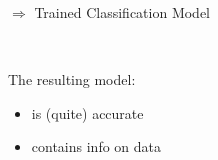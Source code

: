 \documentclass[17pt,aspectratio=169]{beamer}
\begin{document}
\begin{frame}{$\boldsymbol{\Rightarrow}$ Trained Classification Model}
  \begin{minipage}{0.55\linewidth}
    \begin{center}
    \end{center}
  \end{minipage}~%
  \begin{minipage}{0.44\linewidth}
    \pause
    \pause

    \vspace{-1em}
    The resulting model:
    \begin{itemize}
    \item is (quite) accurate
    \item contains info on data
    \end{itemize}
  \end{minipage}

\end{frame}
\end{document}
